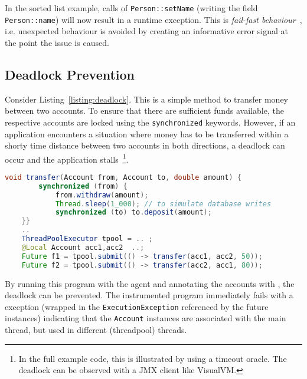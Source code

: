 In the sorted list example, calls of \texttt{Person::setName} (writing the field \texttt{Person::name}) will now result in a runtime exception. 
This is \textit{fail-fast behaviour}~\cite{shore2004fail}, i.e. unexpected behaviour is avoided by creating an informative error signal at the point the issue is caused. 

\subsection{Deadlock Prevention}	

Consider Listing~\ref{listing:deadlock}.  This is a simple method to transfer money between two accounts. To ensure that there are sufficient funds available, the respective accounts are locked using the \texttt{synchronized} keywords.  However, if an application encounters a situation where money has to be transferred within a shorty time distance between two accounts in both directions, a deadlock can occur and the application stalls~\footnote{In the full example code, this is illustrated by using a timeout oracle. The deadlock can be observed with a JMX client like VisualVM.}.


\begin{lstlisting}[language=Java, caption=Money transfer implementation prone to deadlock, label=listing:deadlock]
	void transfer(Account from, Account to, double amount) {
		synchronized (from) {
			from.withdraw(amount);
			Thread.sleep(1_000); // to simulate database writes 
			synchronized (to) to.deposit(amount);
	}}
	.. 
	ThreadPoolExecutor tpool = .. ;
	@Local Account acc1,acc2  ..;
	Future f1 = tpool.submit(() -> transfer(acc1, acc2, 50)); 
	Future f2 = tpool.submit(() -> transfer(acc2, acc1, 80));
\end{lstlisting}

By  running this program with the \jdala agent and annotating the accounts with \Local , the deadlock can be prevented. The instrumented program immediately fails with a \jdala exception (wrapped in the \texttt{ExecutionException} referenced by the future instances) indicating that the \texttt{Account} instances are associated with the main thread, but used in different (threadpool) threads. 
